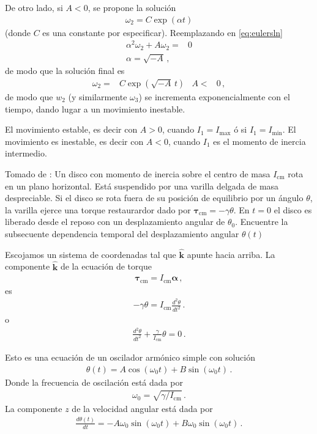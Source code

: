 De otro lado, si $A<0$, se propone la solución
\begin{align}
  \omega_2=C\exp(\alpha t)
\end{align}
(donde $C$ es una constante por especificar). Reemplazando en \eqref{eq:eulersln}
\begin{align}
  \alpha^2\omega_2+A\omega_2=&0 \nonumber\\
\alpha=\sqrt{-A}\,,
\end{align}
de modo que la solución final es
\begin{align}
   \omega_2=&C\exp(\sqrt{-A}\, t)& A<&0\,,
\end{align}
de modo que $w_2$ (y similarmente $\omega_{3}$) se incrementa exponencialmente con el tiempo, dando lugar a un movimiento inestable.

El movimiento estable, es decir con $A>0$, cuando $I_1=I_{\text{max}}$ ó si  $I_1=I_{\text{min}}$. El movimiento es inestable, es decir con $A<0$, cuando $I_1$ es el momento de inercia intermedio.


\ejemplo{}
Tomado de \cite{mit2009}: Un disco con momento de inercia sobre el centro de masa $I_{\text{cm}}$ rota en un plano horizontal. Está suspendido por una varilla delgada de masa despreciable. Si el disco se rota fuera de su posición de equilibrio por un ángulo $\theta$, la varilla ejerce una torque restaurardor dado por $\boldsymbol{\tau}_{\text{cm}}=-\gamma \theta$. En $t=0$ el disco es liberado desde el reposo con un desplazamiento angular de $\theta_0$. Encuentre la subsecuente dependencia temporal del desplazamiento angular $\theta(t)$


Escojamos un sistema de coordenadas tal que $\hat{\mathbf{k}}$ apunte hacia arriba.  La componente $\hat{\mathbf{k}}$ de la ecuación de torque
\begin{align}
  \boldsymbol{\tau}_{\text{cm}}=I_{\text{cm}}\boldsymbol{\alpha}\,,
\end{align}
es
\begin{align}
  -\gamma \theta= I_{\text{cm}}\frac{d^2\theta}{d t^2}\,.
\end{align}
o
\begin{align}
\frac{d^2\theta}{d t^2}+\frac{\gamma}{I_{\text{cm}}}\theta=0\,.
\end{align}

Esto es una ecuación de un oscilador armónico simple con solución
\begin{align}
  \theta(t)=A\cos(\omega_0 t)+B\sin(\omega_0 t)\,.
\end{align}
Donde la frecuencia de oscilación está dada por
\begin{align}
  \omega_0=\sqrt{\gamma/I_{\text{cm}}}\,.
\end{align}
La componente $z$ de la velocidad angular está dada por
\begin{align}
  \frac{d\theta(t)}{dt}=-A\omega_0\sin(\omega_0 t)+B\omega_0\sin(\omega_0 t)\,.
\end{align}

